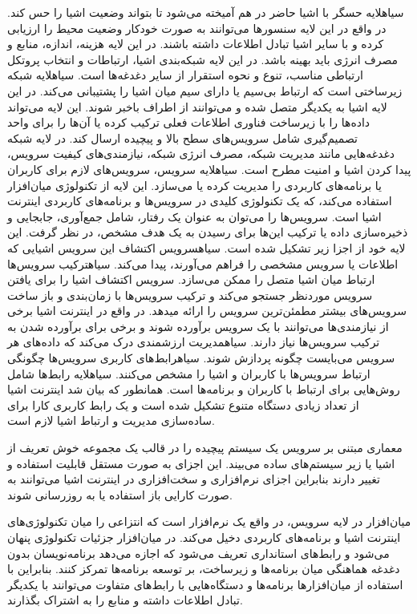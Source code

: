  ‌سیاه{لایه حسگر} با اشیا حاضر در هم آمیخته می‌شود تا بتواند وضعیت اشیا را حس کند. در واقع در این لایه سنسورها می‌توانند به صورت خودکار وضعیت محیط را ارزیابی کرده و با سایر اشیا تبادل اطلاعات داشته باشند.
در این لایه هزینه، اندازه، منابع و مصرف انرژی باید بهینه باشد. در این لایه شبکه‌بندی اشیا، ارتباطات و انتخاب پروتکل ارتباطی مناسب، تنوع و نحوه استقرار از سایر دغدغه‌ها است.
 ‌سیاه{لایه شبکه} زیرساختی است که ارتباط بی‌سیم یا دارای سیم میان اشیا را پشتیبانی می‌کند. در این لایه اشیا به یکدیگر متصل شده و می‌توانند از اطراف باخبر شوند. این لایه می‌تواند داده‌ها را با زیرساخت فناوری اطلاعات فعلی
ترکیب کرده یا آن‌ها را برای واحد تصمیم‌گیری شامل سرویس‌های سطح بالا و پیچیده ارسال کند. در لایه شبکه دغدغه‌هایی مانند مدیریت شبکه، مصرف انرژی شبکه، نیازمندی‌های کیفیت سرویس، پیدا کردن اشیا و امنیت مطرح است.
 ‌سیاه{لایه سرویس}، سرویس‌های لازم برای کاربران یا برنامه‌های کاربردی را مدیریت کرده یا می‌سازد. این لایه از تکنولوژی میان‌افزار استفاده می‌کند، که یک تکنولوژی کلیدی در سرویس‌ها و برنامه‌های کاربردی اینترنت اشیا است.
سرویس‌ها را می‌توان به عنوان یک رفتار، شامل جمع‌آوری، جابجایی و ذخیره‌سازی داده یا ترکیب این‌ها برای رسیدن به یک هدف مشخص، در نظر گرفت.
این لایه خود از اجزا زیر تشکیل شده است.
 ‌سیاه{سرویس اکتشاف} این سرویس اشیایی که اطلاعات یا سرویس مشخصی را فراهم می‌آورند، پیدا می‌کند.
 ‌سیاه{ترکیب سرویس‌ها} ارتباط میان اشیا متصل را ممکن می‌سازد. سرویس اکتشاف اشیا را برای یافتن سرویس موردنظر جستجو می‌کند و ترکیب سرویس‌ها با زمان‌بندی و باز ساخت سرویس‌های بیشتر مطمئن‌ترین سرویس را ارائه میدهد.
در واقع در اینترنت اشیا برخی از نیازمندی‌ها می‌توانند با یک سرویس برآورده شوند و برخی برای برآورده شدن به ترکیب سرویس‌ها نیاز دارند.
 ‌سیاه{مدیریت ارزشمندی} درک می‌کند که داده‌های هر سرویس می‌بایست چگونه پردازش شوند.
 ‌سیاه{رابط‌های کاربری سرویس‌ها} چگونگی ارتباط سرویس‌ها با کاربران و اشیا را مشخص می‌کنند.
 ‌سیاه{لایه رابط‌ها} شامل روش‌هایی برای ارتباط با کاربران و برنامه‌ها است. همانطور که بیان شد اینترنت اشیا از تعداد زیادی دستگاه متنوع تشکیل شده است و یک رابط کاربری کارا برای ساده‌سازی مدیریت و ارتباط اشیا لازم است.

معماری مبتنی بر سرویس یک سیستم پیچیده را در قالب یک مجموعه خوش تعریف از اشیا یا زیر سیستم‌های ساده می‌بیند.
این اجزای به صورت مستقل قابلیت استفاده و تغییر دارند بنابراین اجزای نرم‌افزاری و سخت‌افزاری در اینترنت اشیا می‌توانند به صورت کارایی
باز استفاده یا به روزرسانی شوند.

میان‌افزار در لایه سرویس، در واقع یک نرم‌افزار است که انتزاعی را میان تکنولوژی‌های اینترنت اشیا و برنامه‌های کاربردی دخیل می‌کند.
در میان‌افزار جزئیات تکنولوژی پنهان می‌شود و رابط‌های استانداری تعریف می‌شود که اجازه می‌دهد برنامه‌نویسان بدون دغدغه هماهنگی میان برنامه‌ها و زیرساخت، بر توسعه برنامه‌ها تمرکز کنند.
بنابراین با استفاده از میان‌افزارها برنامه‌ها و دستگاه‌هایی با رابط‌های متفاوت می‌توانند با یکدیگر تبادل اطلاعات داشته و منابع را به اشتراک بگذارند.

